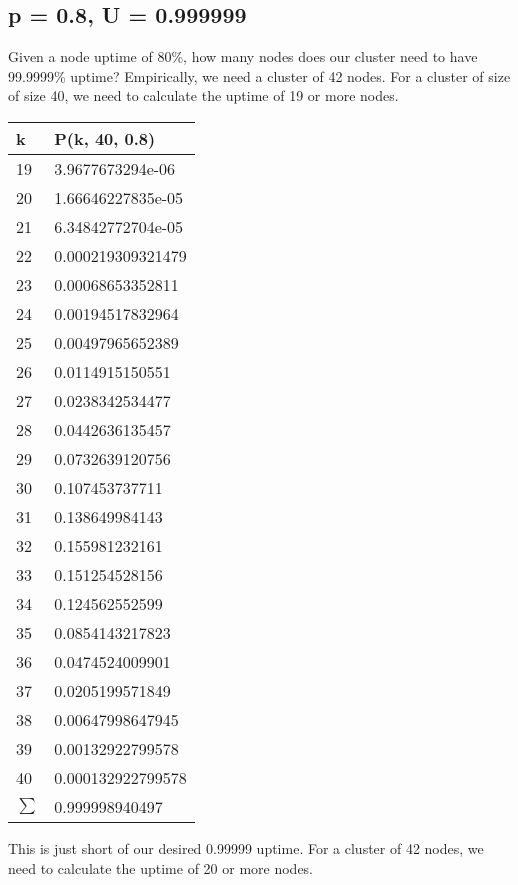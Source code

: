 \documentclass[11pt, oneside]{article}
\begin{document}
\subsection{p = 0.8, U = 0.999999}
Given a node uptime of 80\%, how many nodes does our cluster need to have
99.9999\% uptime?  Empirically, we need a cluster of 42 nodes.
\newline\newline
\noindent For a cluster of size of size 40, we need to calculate the uptime of
19 or more nodes.

\begin{center}
\begin{tabular}{| l | l |}
\hline
k & P(k, 40, 0.8) \\
\hline
19 & 3.9677673294e-06 \\
20 & 1.66646227835e-05 \\
21 & 6.34842772704e-05 \\
22 & 0.000219309321479 \\
23 & 0.00068653352811 \\
24 & 0.00194517832964 \\
25 & 0.00497965652389 \\
26 & 0.0114915150551 \\
27 & 0.0238342534477 \\
28 & 0.0442636135457 \\
29 & 0.0732639120756 \\
30 & 0.107453737711 \\
31 & 0.138649984143 \\
32 & 0.155981232161 \\
33 & 0.151254528156 \\
34 & 0.124562552599 \\
35 & 0.0854143217823 \\
36 & 0.0474524009901 \\
37 & 0.0205199571849 \\
38 & 0.00647998647945 \\
39 & 0.00132922799578 \\
40 & 0.000132922799578 \\
\hline
$\sum$ & 0.999998940497 \\
\hline
\end{tabular}
\end{center}

\noindent This is just short of our desired 0.99999 uptime. For a cluster of 42
nodes, we need to calculate the uptime of 20 or more nodes.
\end{document}
